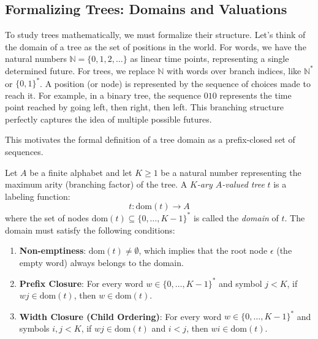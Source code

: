 
\subsection{Formalizing Trees: Domains and Valuations}
To study trees mathematically, we must formalize their structure. Let's think of the domain of a tree as the set of positions in the world. For words, we have the natural numbers $\mathbb{N} = \{0, 1, 2, \dots\}$ as linear time points, representing a single determined future. For trees, we replace $\mathbb{N}$ with words over branch indices, like $\mathbb{N}^*$ or $\{0,1\}^*$. A position (or node) is represented by the sequence of choices made to reach it. For example, in a binary tree, the sequence $010$ represents the time point reached by going left, then right, then left. This branching structure perfectly captures the idea of multiple possible futures.

This motivates the formal definition of a tree domain as a prefix-closed set of sequences.

\begin{definition}
Let $A$ be a finite alphabet and let $K \ge 1$ be a natural number representing the maximum arity (branching factor) of the tree. A \emph{$K$-ary $A$-valued tree} $t$ is a labeling function:
$$t: \text{dom}(t) \to A$$
where the set of nodes $\text{dom}(t) \subseteq \{0, \dots, K-1\}^*$ is called the \emph{domain} of $t$. The domain must satisfy the following conditions:
\begin{enumerate}
    \item \textbf{Non-emptiness}: $\text{dom}(t) \neq \emptyset$, which implies that the root node $\epsilon$ (the empty word) always belongs to the domain.
    \item \textbf{Prefix Closure}: For every word $w \in \{0, \dots, K-1\}^*$ and symbol $j < K$, if $w j \in \text{dom}(t)$, then $w \in \text{dom}(t)$.
    \item \textbf{Width Closure (Child Ordering)}: For every word $w \in \{0, \dots, K-1\}^*$ and symbols $i, j < K$, if $w j \in \text{dom}(t)$ and $i < j$, then $w i \in \text{dom}(t)$.
\end{enumerate}
\end{definition}

